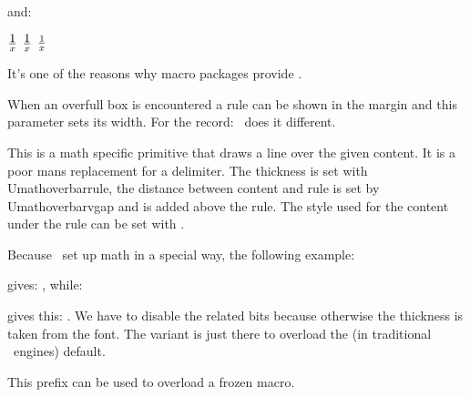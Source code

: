 and:

\starttyping
$  \textstyle 1  \over x  $
$ {\textstyle 1} \over x  $
$  \textstyle {1 \over x} $
\stoptyping

It's one of the reasons why macro packages provide \type {\frac}.

\stopoldprimitive

\startoldprimitive[title={\prm {overfullrule}}]

When an overfull box is encountered a rule can be shown in the margin and this
parameter sets its width. For the record: \CONTEXT\ does it different.

\stopoldprimitive

\startoldprimitive[title={\prm {overline}}]

This is a math specific primitive that draws a line over the given content. It is
a poor mans replacement for a delimiter. The thickness is set with \prm
{Umathoverbarrule}, the distance between content and rule is set by \prm
{Umathoverbarvgap} and  is added above the rule. The style
used for the content under the rule can be set with .

Because \CONTEXT\ set up math in a special way, the following example:

\startbuffer[demo]
\stopbuffer

\typebuffer[demo]

gives: , while:

\startbuffer[setup]
\mathfontcontrol\zerocount
\Umathoverbarkern{}
\Umathoverbarvgap{}
\Umathoverbarrule{}
\Umathoverlinevariant\textstyle\scriptstyle
\stopbuffer

\typebuffer[setup]

gives this: . We have to disable the related
 bits because otherwise the thickness is taken from the font. The
variant is just there to overload the (in traditional \TEX\ engines) default.

\stopoldprimitive

\startnewprimitive[title={\prm {overloaded}}]

This prefix can be used to overload a frozen macro.

\stopnewprimitive

